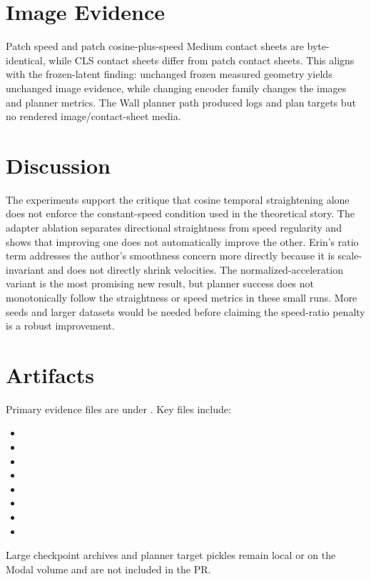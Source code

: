 \documentclass[11pt]{article}
\begin{document}
\section{Image Evidence}

Patch speed and patch cosine-plus-speed Medium contact sheets are byte-identical, while CLS contact sheets differ from patch contact sheets. This aligns with the frozen-latent finding: unchanged frozen measured geometry yields unchanged image evidence, while changing encoder family changes the images and planner metrics. The Wall planner path produced logs and plan targets but no rendered image/contact-sheet media.

\section{Discussion}

The experiments support the critique that cosine temporal straightening alone does not enforce the constant-speed condition used in the theoretical story. The adapter ablation separates directional straightness from speed regularity and shows that improving one does not automatically improve the other. Erin's ratio term addresses the author's smoothness concern more directly because it is scale-invariant and does not directly shrink velocities. The normalized-acceleration variant is the most promising new result, but planner success does not monotonically follow the straightness or speed metrics in these small runs. More seeds and larger datasets would be needed before claiming the speed-ratio penalty is a robust improvement.

\section{Artifacts}

Primary evidence files are under . Key files include:
\begin{itemize}
  \item {}
  \item {}
  \item {}
  \item {}
  \item {}
  \item {}
  \item {}
  \item {}
\end{itemize}
Large checkpoint archives and planner target pickles remain local or on the Modal volume and are not included in the PR.
\end{document}
